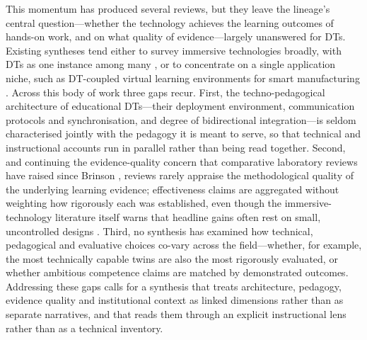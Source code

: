 This momentum has produced several reviews, but they leave the lineage's
central question---whether the technology achieves the learning outcomes of
hands-on work, and on what quality of evidence---largely unanswered for DTs.
Existing syntheses tend either to survey immersive technologies broadly,
with DTs as one instance among many \citep{lampropoulos_virtual_2025, tokhayeva_virtualisation_2026, jiang_state_2026}, or to concentrate on a single
application niche, such as DT-coupled virtual learning environments for smart
manufacturing \citep{kumar_karanam_systematic_2025}. Across this body of work three
gaps recur. First, the techno-pedagogical architecture of educational DTs---their
deployment environment, communication protocols and synchronisation, and degree
of bidirectional integration---is seldom characterised jointly with the pedagogy it
is meant to serve, so that technical and instructional accounts run in parallel
rather than being read together. Second, and continuing the evidence-quality
concern that comparative laboratory reviews have raised since Brinson
\citep{brinson_learning_2015, heradio_virtual_2016}, reviews rarely appraise the
methodological quality of the underlying learning evidence; effectiveness claims
are aggregated without weighting how rigorously each was established, even though
the immersive-technology literature itself warns that headline gains often rest
on small, uncontrolled designs \citep{fan_impacts_2025, giussani_study_2025}.
Third, no synthesis has examined how technical, pedagogical and evaluative
choices co-vary across the field---whether, for example, the most technically
capable twins are also the most rigorously evaluated, or whether ambitious
competence claims are matched by demonstrated outcomes. Addressing these gaps
calls for a synthesis that treats architecture, pedagogy, evidence quality and
institutional context as linked dimensions rather than as separate narratives,
and that reads them through an explicit instructional lens rather than as a
technical inventory.

